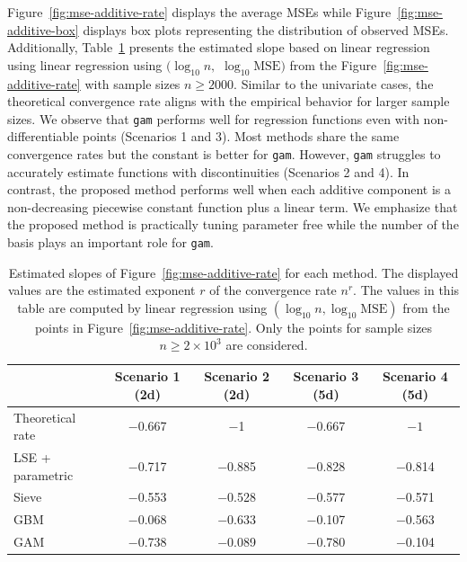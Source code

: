 \documentclass[12pt]{article}
\begin{document}
Figure~\ref{fig:mse-additive-rate} displays the average MSEs while Figure~\ref{fig:mse-additive-box} displays box plots representing the distribution of observed MSEs. Additionally, Table~\ref{tab:est-additive-slope} presents the estimated slope based on linear regression using linear regression using $(\log_{10} n,$ $ \log_{10} \textrm{MSE})$ from the Figure~\ref{fig:mse-additive-rate} with sample sizes $n \ge 2000$. Similar to the univariate cases, the theoretical convergence rate aligns with the empirical behavior for larger sample sizes. We observe that \texttt{gam} performs well for regression functions even with non-differentiable points (Scenarios 1 and 3). Most methods share the same convergence rates but the constant is better for \texttt{gam}. However, \texttt{gam} struggles to accurately estimate functions with discontinuities (Scenarios 2 and 4). In contrast, the proposed method performs well when each additive component is a non-decreasing piecewise constant function plus a linear term. We emphasize that the proposed method is practically tuning parameter free while the number of the basis plays an important role for \texttt{gam}.

\begin{table}[t]
\centering
\begin{tabular}{l|cccc}
                 & Scenario 1 (2d) & Scenario 2 (2d) & Scenario 3 (5d)& Scenario 4 (5d)\\ \hline
Theoretical rate & $-$0.667     & $-$1         & $-$0.667       & $-1$         \\
LSE + parametric & $-$0.717     & $-$0.885     & $-$0.828     & $-$0.814     \\
Sieve            & $-$0.553     & $-$0.528     &  $-$0.577    & $-$0.571     \\
GBM              & $-$0.068     & $-$0.633     & $-0$.107     & $-$0.563        \\
GAM              & $-$0.738     & $-$0.089     & $-$0.780     &  $-$0.104 
\end{tabular}
\caption{Estimated slopes of Figure~\ref{fig:mse-additive-rate} for each method. The displayed values are the estimated exponent $r$ of the convergence rate $n^r$. The values in this table are computed by linear regression using $(\log_{10} n, \log_{10} \textrm{MSE})$ from the points in Figure~\ref{fig:mse-additive-rate}. Only the points for sample sizes $n \ge 2\times 10^3$ are considered. 
}
\label{tab:est-additive-slope}
\end{table}
\end{document}
